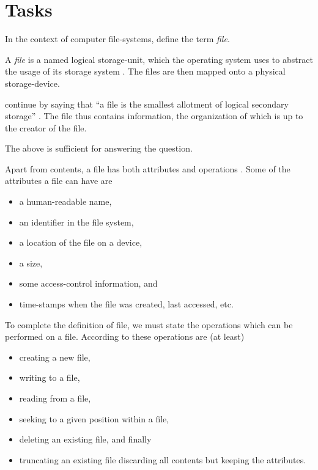 \documentclass[a4paper]{miunasgn}
\begin{document}
\section{Tasks}
\label{sec:Work}
\begin{questions}
	\question\label{q:file}
	In the context of computer file-systems, define the term \emph{file}.
	\begin{solution}
		A \emph{file} is a named logical storage-unit, which the operating system 
		uses to abstract the usage of its storage system \cite[p.  
		421]{Silberschatz2009osc}.
		The files are then mapped onto a physical storage-device.

		\citeauthor{Silberschatz2009osc} continue by saying that ``a file is the 
		smallest allotment of logical secondary storage'' \cite[p.  
		422]{Silberschatz2009osc}.
		The file thus contains information, the organization of which is up to the 
		creator of the file.

		The above is sufficient for answering the question.

		Apart from contents, a file has both attributes and operations \citep[pp.  
		422--423]{Silberschatz2009osc}.
		Some of the attributes a file can have are
		\begin{itemize}
			\item a human-readable name,
			\item an identifier in the file system,
			\item a location of the file on a device,
			\item a size,
			\item some access-control information, and
			\item time-stamps when the file was created, last accessed, etc.
		\end{itemize}

		To complete the definition of file, we must state the operations which can 
		be performed on a file.
		According to \citet[p. 423]{Silberschatz2009osc} these operations are (at 
		least)
		\begin{itemize}
			\item creating a new file,
			\item writing to a file,
			\item reading from a file,
			\item seeking to a given position within a file,
			\item deleting an existing file, and finally
			\item truncating an existing file discarding all contents but keeping the 
				attributes.
		\end{itemize}
	\end{solution}


\end{questions}
\end{document}
